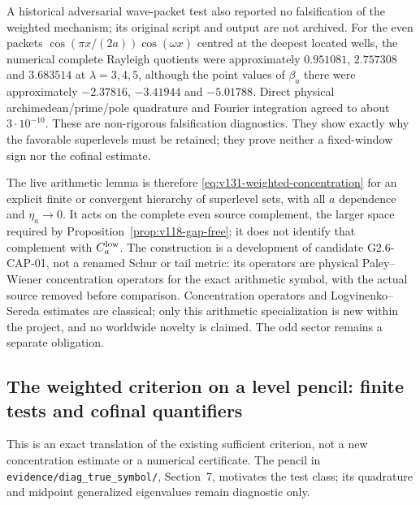\documentclass[11pt]{article}
\theoremstyle{remark}
\begin{document}
A historical adversarial wave-packet test also reported no falsification
of the weighted mechanism; its original script and output are not archived.  For the even packets
$\cos(\pi x/(2a))\cos(\omega x)$ centred at the deepest located wells,
the numerical complete Rayleigh quotients were approximately
$0.951081$, $2.757308$ and $3.683514$ at $\lambda=3,4,5$, although the
point values of $\beta_a$ there were approximately $-2.37816$,
$-3.41944$ and $-5.01788$.  Direct physical archimedean/prime/pole
quadrature and Fourier integration agreed to about $3\cdot10^{-10}$.
These are non-rigorous falsification diagnostics.  They show exactly
why the favorable superlevels must be retained; they prove neither a
fixed-window sign nor the cofinal estimate.

The live arithmetic lemma is therefore
\eqref{eq:v131-weighted-concentration} for an explicit finite or
convergent hierarchy of superlevel sets, with all $a$ dependence and
$\eta_a\to0$.  It acts on the complete even source complement, the
larger space required by Proposition~\ref{prop:v118-gap-free}; it does
not identify that complement with $C_a^{\rm low}$.  The construction
is a development of candidate G2.6-CAP-01, not a renamed Schur or tail
metric: its operators are physical Paley--Wiener concentration
operators for the exact arithmetic symbol, with the actual source
removed before comparison.  Concentration operators and
Logvinenko--Sereda estimates are classical; only this arithmetic
specialization is new within the project, and no worldwide novelty is
claimed.  The odd sector remains a separate obligation.

\subsection*{The weighted criterion on a level pencil: finite tests and cofinal quantifiers}

This is an exact translation of the existing sufficient criterion, not a
new concentration estimate or a numerical certificate. The pencil in
\texttt{evidence/diag\_true\_symbol/}, Section~7, motivates the test class;
its quadrature and midpoint generalized eigenvalues remain diagnostic only.
\end{document}
